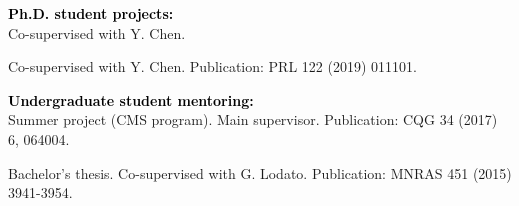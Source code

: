 \documentclass[a4paper]{moderncv}
\begin{document}
\textbf{\textcolor{black}{Ph.D. student projects:}}\vspace{0.05cm}\\
 \vspace{-0.1cm}
\vspace{-0.0cm}
\hspace{0.8cm}Co-supervised with Y. Chen. 
\vspace{0.1cm}

 \vspace{-0.1cm}
\vspace{-0.0cm}
\hspace{0.8cm}Co-supervised with Y. Chen. Publication: PRL 122 (2019) 011101.
\vspace{0.2cm}


\textbf{\textcolor{black}{Undergraduate student mentoring:}}\vspace{0.1cm}
\\
\vspace{-0.1cm}
\vspace{-0.0cm}
\hspace{0.8cm}Summer project (CMS program). Main supervisor. Publication: CQG 34 (2017) 6, 064004.


\vspace{0.1cm}
\vspace{-0.1cm}
\vspace{-0.0cm}
\hspace{0.8cm}Bachelor's thesis. Co-supervised with G. Lodato. Publication: MNRAS 451 (2015) 3941-3954. 
\end{document}
